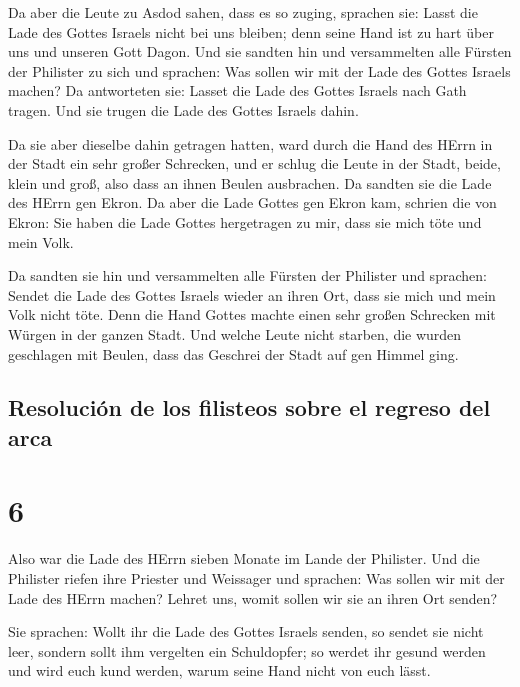  Da aber die Leute zu Asdod sahen, dass es so zuging,
sprachen sie: Lasst die Lade des Gottes Israels nicht bei uns bleiben;
denn seine Hand ist zu hart über uns und unseren Gott Dagon.
 Und sie sandten hin und versammelten alle Fürsten der
Philister zu sich und sprachen: Was sollen wir mit der Lade des Gottes
Israels machen? Da antworteten sie: Lasset die Lade des Gottes Israels
nach Gath tragen. Und sie trugen die Lade des Gottes Israels dahin.

 Da sie aber dieselbe dahin getragen hatten, ward durch
die Hand des HErrn in der Stadt ein sehr großer Schrecken, und er schlug
die Leute in der Stadt, beide, klein und groß, also dass an ihnen Beulen
ausbrachen.  Da sandten sie die Lade des HErrn gen Ekron.
Da aber die Lade Gottes gen Ekron kam, schrien die von Ekron: Sie haben
die Lade Gottes hergetragen zu mir, dass sie mich töte und mein Volk.

 Da sandten sie hin und versammelten alle Fürsten der
Philister und sprachen: Sendet die Lade des Gottes Israels wieder an
ihren Ort, dass sie mich und mein Volk nicht töte. Denn die Hand Gottes
machte einen sehr großen Schrecken mit Würgen in der ganzen Stadt.
 Und welche Leute nicht starben, die wurden geschlagen
mit Beulen, dass das Geschrei der Stadt auf gen Himmel ging.

\hypertarget{resoluciuxf3n-de-los-filisteos-sobre-el-regreso-del-arca}{%
\subsection{Resolución de los filisteos sobre el regreso del
arca}\label{resoluciuxf3n-de-los-filisteos-sobre-el-regreso-del-arca}}

\hypertarget{section-5}{%
\section{6}\label{section-5}}

 Also war die Lade des HErrn sieben Monate im Lande der
Philister.  Und die Philister riefen ihre Priester und
Weissager und sprachen: Was sollen wir mit der Lade des HErrn machen?
Lehret uns, womit sollen wir sie an ihren Ort senden?

 Sie sprachen: Wollt ihr die Lade des Gottes Israels
senden, so sendet sie nicht leer, sondern sollt ihm vergelten ein
Schuldopfer; so werdet ihr gesund werden und wird euch kund werden,
warum seine Hand nicht von euch lässt.


